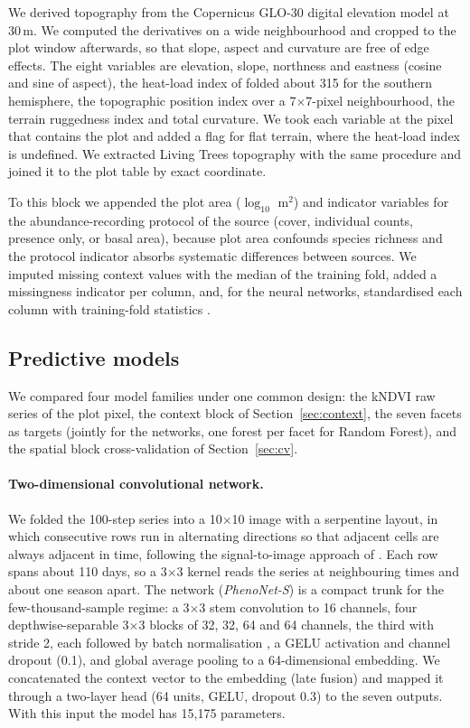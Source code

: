 \documentclass[preprint,12pt]{elsarticle}
\begin{document}
We derived topography from the Copernicus GLO-30 digital elevation model
\citep{esa2022copdem} at 30\,m. We computed the derivatives on a wide neighbourhood and
cropped to the plot window afterwards, so that slope, aspect and curvature are free of edge
effects. The eight variables are elevation, slope, northness and eastness (cosine and sine
of aspect), the heat-load index of \citet{mccune2002heatload} folded about 315\textdegree{}
for the southern hemisphere, the topographic position index \citep{weiss2001topographic}
over a 7$\times$7-pixel neighbourhood, the terrain ruggedness index
\citep{riley1999terrain} and total curvature. We took each variable at the pixel that
contains the plot and added a flag for flat terrain, where the heat-load index is
undefined. We extracted Living Trees topography with the same procedure and joined it to
the plot table by exact coordinate.

To this block we appended the plot area ($\log_{10}$ m$^2$) and indicator variables for
the abundance-recording protocol of the source (cover, individual counts, presence only, or
basal area), because plot area confounds species richness and the protocol indicator
absorbs systematic differences between sources. We imputed missing context values with the
median of the training fold, added a missingness indicator per column, and, for the neural
networks, standardised each column with training-fold statistics
\citep{pedregosa2011scikit}.

\subsection{Predictive models}
\label{sec:models}

We compared four model families under one common design: the kNDVI raw series of the plot
pixel, the context block of Section~\ref{sec:context}, the seven facets as targets (jointly
for the networks, one forest per facet for Random Forest), and the spatial block
cross-validation of Section~\ref{sec:cv}.

\paragraph{Two-dimensional convolutional network.}
We folded the 100-step series into a 10$\times$10 image with a serpentine layout, in which
consecutive rows run in alternating directions so that adjacent cells are always adjacent
in time, following the signal-to-image approach of \citet{lopatin_trait2dcnn}. Each row
spans about 110 days, so a 3$\times$3 kernel reads the series at neighbouring times and
about one season apart. The network (\emph{PhenoNet-S}) is a compact trunk for the
few-thousand-sample regime: a 3$\times$3 stem convolution to 16 channels, four
depthwise-separable 3$\times$3 blocks \citep{chollet2017xception} of 32, 32, 64 and 64
channels, the third with stride 2, each followed by batch normalisation
\citep{ioffe2015batch}, a GELU activation \citep{hendrycks2016gelu} and channel dropout
(0.1), and global average pooling to a 64-dimensional embedding. We concatenated the
context vector to the embedding (late fusion) and mapped it through a two-layer head
(64 units, GELU, dropout 0.3) to the seven outputs. With this input the model has
15,175 parameters.
\end{document}
